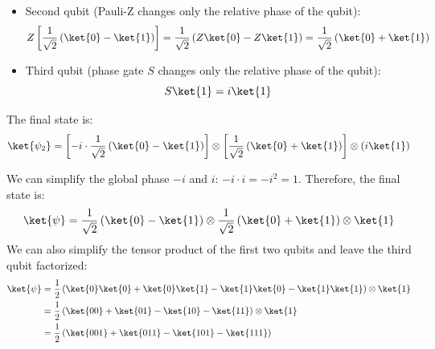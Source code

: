 \begin{itemize}
\begin{itemize}
        Therefore:
        \begin{equation*}
            Y \left[\frac{1}{\sqrt{2}} \left(\ket{0} + \ket{1}\right)\right] = \frac{1}{\sqrt{2}} \left(-i \ket{0} + i \ket{1}\right) = i \cdot \frac{1}{\sqrt{2}} \left(\ket{1} - \ket{0}\right)
        \end{equation*}
        We don't like how the minus sign is in front of the  term, so we can factor out a $-1$ to get:
        \begin{equation*}
            i \cdot \frac{1}{\sqrt{2}} \left(\ket{1} - \ket{0}\right) = -i \cdot \frac{1}{\sqrt{2}} \left(\ket{0} - \ket{1}\right)
        \end{equation*}
        \item Second qubit (Pauli-Z changes only the relative phase of the  qubit):
        \begin{equation*}
            Z \left[\frac{1}{\sqrt{2}} \left(\ket{0} - \ket{1}\right)\right] = \frac{1}{\sqrt{2}} \left(Z\ket{0} - Z\ket{1}\right) = \frac{1}{\sqrt{2}} \left(\ket{0} + \ket{1}\right)
        \end{equation*}
        \item Third qubit (phase gate $S$ changes only the relative phase of the  qubit):
        \begin{equation*}
            S \ket{1} = i \ket{1}
        \end{equation*}
    \end{itemize}
    The final state is:
    \begin{equation*}
        \ket{\psi_2} = \left[-i \cdot \frac{1}{\sqrt{2}} \left(\ket{0} - \ket{1}\right)\right] \otimes \left[\frac{1}{\sqrt{2}} \left(\ket{0} + \ket{1}\right)\right] \otimes \left(i \ket{1}\right)
    \end{equation*}
\end{itemize}
We can simplify the global phase $-i$ and $i$: $-i \cdot i = -i^2 = 1$. Therefore, the final state is:
\begin{equation*}
    \ket{\psi} = \frac{1}{\sqrt{2}} \left(\ket{0} - \ket{1}\right) \otimes \frac{1}{\sqrt{2}} \left(\ket{0} + \ket{1}\right) \otimes \ket{1}
\end{equation*}
We can also simplify the tensor product of the first two qubits and leave the third qubit factorized:
\begin{align*}
    \ket{\psi} &= \frac{1}{2} \left(\ket{0}\ket{0} + \ket{0}\ket{1} - \ket{1}\ket{0} - \ket{1}\ket{1}\right) \otimes \ket{1} \\
    &= \frac{1}{2} \left(\ket{00} + \ket{01} - \ket{10} - \ket{11}\right) \otimes \ket{1} \\
    &= \frac{1}{2} \left(\ket{001} + \ket{011} - \ket{101} - \ket{111}\right)
\end{align*}